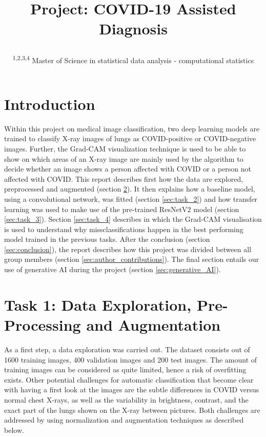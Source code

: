 \documentclass[conference]{IEEEtran}
\begin{document}
\title{Project: COVID-19 Assisted Diagnosis\\


\author{
\and
{}
\and
{}
\and
{}

\and


\textsuperscript{1,2,3,4}  Master of Science in statistical data analysis - computational statistics\hfill}}

\maketitle



\section{Introduction}
Within this project on medical image classification, two deep learning models are trained to classify X-ray images of lungs as COVID-positive or COVID-negative images. Further, the Grad-CAM visualization technique is used to be able to show on which areas of an X-ray image are mainly used by the algorithm to decide whether an image shows a person affected with COVID or a person not affected with COVID. This report describes first how the data are explored, preprocessed and augmented (section \ref{sec:task_1}). It then explains how a baseline model, using a convolutional network, was fitted (section \ref{sec:task_2}) and how transfer learning was used to make use of the pre-trained ResNetV2 model (section \ref{sec:task_3}). Section \ref{sec:task_4} describes in which the Grad-CAM visualisation is used to understand why missclassifications happen in the best performing model trained in the previous tasks.
After the conclusion (section \ref{sec:conclusion}), the report describes how this project was divided between all group members (section \ref{sec:author_contributions}). The final section entails our use of generative AI during the project (section \ref{sec:generative_AI}).


\section{Task 1: Data Exploration, Pre-Processing and Augmentation}\label{sec:task_1}

As a first step, a data exploration was carried out. The dataset consists out of 1600 training images, 400 validation images and 200 test images. The amount of training images can be considered as quite limited, hence a risk of overfitting exists. Other potential challenges for automatic classification that become clear with having a first look at the images are the subtle differences in COVID versus normal chest X-rays, as well as the variability in brightness, contrast, and the exact part of the lungs shown on the X-ray between pictures. Both challenges are addressed by using normalization and augmentation techniques as described below.
\end{document}
